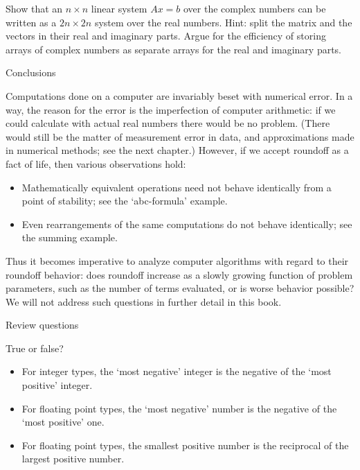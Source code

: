 \begin{exercise}
  Show that an $n\times n$ linear system $Ax=b$ over the complex numbers
  can be written as a $2n\times 2n$ system over the real
  numbers. Hint: split the matrix and the vectors in their real and
  imaginary parts. Argue for the efficiency of storing arrays of
  complex numbers as separate arrays for the real and imaginary parts.
\end{exercise}


 {Conclusions}

Computations done on a computer are invariably beset with numerical error.
In a way, the reason for the error is the imperfection of computer
arithmetic: if we could calculate with actual real numbers there would
be no problem. (There would still be the matter of measurement error
in data, and approximations made in numerical methods; see the next
chapter.) However, if we accept roundoff as a fact of life, then
various observations hold:
\begin{itemize}
\item Mathematically equivalent operations need not behave identically
  from a point of stability; see the `abc-formula' example.
\item Even rearrangements of the same computations do not behave
  identically; see the summing example.
\end{itemize}
Thus it
becomes imperative to analyze computer algorithms with regard to their
roundoff behavior: does roundoff increase as a slowly growing
function of problem parameters, such as the number of terms evaluated,
or is worse behavior possible? We will not address such questions in
further detail in this book.


 {Review questions}

\begin{exercise}
  True or false?
  \begin{itemize}
  \item For integer types, the `most negative' integer is the negative
    of the `most positive' integer.
  \item For floating point types, the `most negative' number is the negative
    of the `most positive' one.
  \item For floating point types, the smallest positive number is the reciprocal
    of the largest positive number.
  \end{itemize}
\end{exercise}

